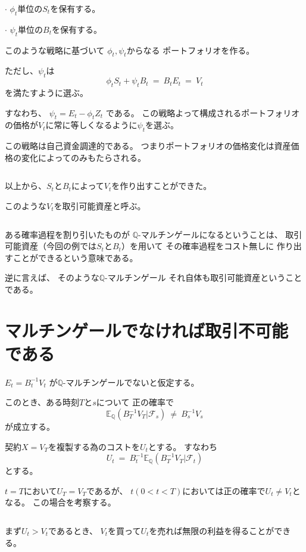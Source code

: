 \documentclass[uplatex,a4j,12pt,dvipdfmx]{jsarticle}
\begin{document}
\hspace{5mm} $\cdot$ $\phi_{t}$単位の$S_{t}$を保有する。

\hspace{5mm} $\cdot$ $\psi_{t}$単位の$B_{t}$を保有する。

このような戦略に基づいて
$\phi_{t},\psi_{t}$からなる
ポートフォリオを作る。

ただし、$\psi_{t}$は
$$
	\phi_{t} S_{t} + \psi_{t} B_{t} \ = \ B_{t} E_{t} \ = \ V_{t}
$$
を満たすように選ぶ。

すなわち、
$\psi_{t} = E_{t} - \phi_{t} Z_{t}$
である。
この戦略よって構成されるポートフォリオの価格が$V_{t}$に常に等しくなるように$\psi_{t}$を選ぶ。

この戦略は自己資金調達的である。
つまりポートフォリオの価格変化は資産価格の変化によってのみもたらされる。

${}$

以上から、$S_{t}$と$B_{t}$によって$V_{t}$を作り出すことができた。

このような$V_{t}$を取引可能資産と呼ぶ。

${}$

ある確率過程を割り引いたものが
$\mathbb{Q}$-マルチンゲールになるということは、
取引可能資産（今回の例では$S_{t}$と$B_{t}$）を用いて
その確率過程をコスト無しに
作り出すことができるという意味である。

逆に言えば、
そのような$\mathbb{Q}$-マルチンゲール
それ自体も取引可能資産ということである。

\section*{マルチンゲールでなければ取引不可能である}

$E_{t} = B^{-1}_{t} V_{t}$
が$\mathbb{Q}$-マルチンゲールでないと仮定する。

このとき、ある時刻$T$と$s$について
正の確率で
$$
	\mathbb{E}_{\mathbb{Q}}( B^{-1}_{T} V_{T} | \mathcal{F}_{s} )
	\ \neq \
	B^{-1}_{s} V_{s}
$$
が成立する。

契約$X=V_{T}$を複製する為のコストを$U_{t}$とする。
すなわち
$$
	U_{t}
	\ = \
	B^{-1}_{t}
	\mathbb{E}_{\mathbb{Q}}( B^{-1}_{T} V_{T} | \mathcal{F}_{t} )
$$
とする。

$t=T$において$U_{T}=V_{T}$であるが、
$t(0<t<T)$においては正の確率で$U_{t} \neq V_{t}$となる。
この場合を考察する。

${}$

まず$U_{t} > V_{t}$であるとき、
$V_{t}$を買って$U_{t}$を売れば無限の利益を得ることができる。
\end{document}
